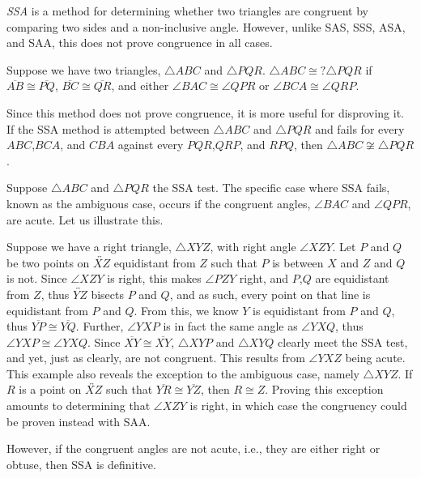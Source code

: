 \documentclass[12pt]{article}
\begin{document}
\emph{SSA} is a method for determining whether two triangles are congruent by comparing two sides and a non-inclusive angle.  However, unlike SAS, SSS, ASA, and SAA, this does not prove congruence in all cases.

Suppose we have two triangles, $\triangle ABC$ and $\triangle PQR$.  $\triangle ABC \cong? \triangle PQR$ if $\overline{AB} \cong \overline{PQ}$, $\overline{BC} \cong \overline{QR}$, and either $\angle BAC \cong \angle QPR$ or $\angle BCA \cong \angle QRP$.

Since this method does not prove congruence, it is more useful for disproving it.  If the SSA method is attempted between $\triangle ABC$ and $\triangle PQR$ and fails for every $ABC$,$BCA$, and $CBA$ against every $PQR$,$QRP$, and $RPQ$, then $\triangle ABC \not\cong \triangle PQR$.

Suppose $\triangle ABC$ and $\triangle PQR$  the SSA test.  The specific case where SSA fails, known as the ambiguous case, occurs if the congruent angles, $\angle BAC$ and  $\angle QPR$, are acute.  Let us illustrate this.

Suppose we have a right triangle, $\triangle XYZ$, with right angle $\angle XZY$.  Let $P$ and $Q$ be two points on $\overleftrightarrow{XZ}$ equidistant from $Z$ such that $P$ is between $X$ and $Z$ and $Q$ is not.  Since $\angle XZY$ is right, this makes $\angle PZY$ right, and $P$,$Q$ are equidistant from $Z$, thus $\overleftrightarrow {YZ}$ bisects $P$ and $Q$, and as such, every point on that line is equidistant from $P$ and $Q$.  From this, we know $Y$ is equidistant from $P$ and $Q$, thus $\overline{YP} \cong \overline{YQ}$.  Further, $\angle YXP$ is in fact the same angle as $\angle YXQ$, thus $\angle YXP \cong \angle YXQ$.  Since $\overline{XY} \cong \overline{XY}$, $\triangle XYP$ and $\triangle XYQ$ clearly meet the SSA test, and yet, just as clearly, are not congruent.  This results from $\angle YXZ$ being acute.  This example also reveals the exception to the ambiguous case, namely $\triangle XYZ$.  If $R$ is a point on $\overleftrightarrow{XZ}$ such that $\overline{YR} \cong \overline{YZ}$, then $R \cong Z$.  Proving this exception amounts to determining that $\angle XZY$ is right, in which case the congruency could be proven instead with SAA.

However, if the congruent angles are not acute, i.e., they are either right or obtuse, then SSA is definitive.
\end{document}

